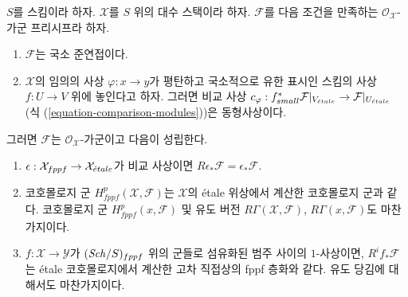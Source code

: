 \begin{lemma}
\label{lemma-compare-fppf-etale}
$S$를 스킴이라 하자. $\mathcal{X}$를 $S$ 위의 대수 스택이라 하자.
$\mathcal{F}$를 다음 조건을 만족하는 $\mathcal{O}_\mathcal{X}$-가군
프리시프라 하자.
\begin{enumerate}
\item[(a)] $\mathcal{F}$는 국소 준연접이다.
\item[(b)] $\mathcal{X}$의 임의의 사상 $\varphi : x \to y$가
평탄하고 국소적으로 유한 표시인 스킴의 사상 $f : U \to V$ 위에
놓인다고 하자. 그러면 비교 사상
$c_\varphi : f_{small}^*\mathcal{F}|_{V_{\acute{e}tale}} \to
\mathcal{F}|_{U_{\acute{e}tale}}$ (식
(\ref{equation-comparison-modules}))은 동형사상이다.
\end{enumerate}
그러면 $\mathcal{F}$는 $\mathcal{O}_\mathcal{X}$-가군이고 다음이 성립한다.
\begin{enumerate}
\item $\epsilon : \mathcal{X}_{fppf} \to \mathcal{X}_{\acute{e}tale}$가
비교 사상이면
$R\epsilon_*\mathcal{F} = \epsilon_*\mathcal{F}$.
\item 코호몰로지 군 $H^p_{fppf}(\mathcal{X}, \mathcal{F})$는
$\mathcal{X}$의 \'etale 위상에서 계산한 코호몰로지 군과 같다.
코호몰로지 군 $H^p_{fppf}(x, \mathcal{F})$ 및 유도 버전
$R\Gamma(\mathcal{X}, \mathcal{F})$, $R\Gamma(x, \mathcal{F})$도
마찬가지이다.
\item $f : \mathcal{X} \to \mathcal{Y}$가
$(\mathit{Sch}/S)_{fppf}$ 위의 군들로 섬유화된 범주 사이의
$1$-사상이면, $R^if_*\mathcal{F}$는 \'etale 코호몰로지에서
계산한 고차 직접상의 fppf 층화와 같다.
유도 당김에 대해서도 마찬가지이다.
\end{enumerate}
\end{lemma}

